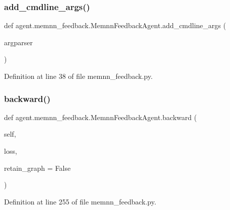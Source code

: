 \subsubsection{\texorpdfstring{add\+\_\+cmdline\+\_\+args()}{add\_cmdline\_args()}}
{\footnotesize\ttfamily def agent.\+memnn\+\_\+feedback.\+Memnn\+Feedback\+Agent.\+add\+\_\+cmdline\+\_\+args (\begin{DoxyParamCaption}\item[{}]{argparser }\end{DoxyParamCaption})\hspace{0.3cm}{\ttfamily [static]}}



Definition at line 38 of file memnn\+\_\+feedback.\+py.

\mbox{\label{classagent_1_1memnn__feedback_1_1MemnnFeedbackAgent_a694d5215e16fe557e56c1b0ca767e796}} 
\subsubsection{\texorpdfstring{backward()}{backward()}}
{\footnotesize\ttfamily def agent.\+memnn\+\_\+feedback.\+Memnn\+Feedback\+Agent.\+backward (\begin{DoxyParamCaption}\item[{}]{self,  }\item[{}]{loss,  }\item[{}]{retain\+\_\+graph = {\ttfamily False} }\end{DoxyParamCaption})}



Definition at line 255 of file memnn\+\_\+feedback.\+py.



